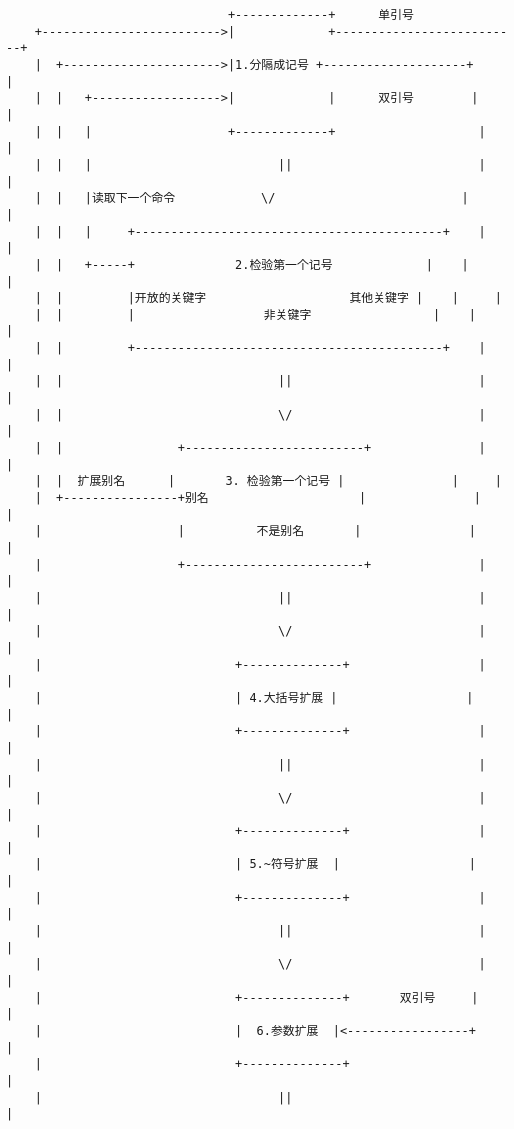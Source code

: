 \begin{lstlisting}
                               +-------------+      单引号
    +------------------------->|             +--------------------------+
    |  +---------------------->|1.分隔成记号 +--------------------+     |
    |  |   +------------------>|             |      双引号        |     |
    |  |   |                   +-------------+                    |     |
    |  |   |                          ||                          |     |
    |  |   |读取下一个命令            \/                          |     |
    |  |   |     +-------------------------------------------+    |     |
    |  |   +-----+              2.检验第一个记号             |    |     |
    |  |         |开放的关键字                    其他关键字 |    |     |
    |  |         |                  非关键字                 |    |     |
    |  |         +-------------------------------------------+    |     |
    |  |                              ||                          |     |
    |  |                              \/                          |     |
    |  |                +-------------------------+               |     |
    |  |  扩展别名      |       3. 检验第一个记号 |               |     |
    |  +----------------+别名                     |               |     |
    |                   |          不是别名       |               |     |
    |                   +-------------------------+               |     |
    |                                 ||                          |     |
    |                                 \/                          |     |
    |                           +--------------+                  |     |
    |                           | 4.大括号扩展 |                  |     |
    |                           +--------------+                  |     |
    |                                 ||                          |     |
    |                                 \/                          |     |
    |                           +--------------+                  |     |
    |                           | 5.~符号扩展  |                  |     |
    |                           +--------------+                  |     |
    |                                 ||                          |     |
    |                                 \/                          |     |
    |                           +--------------+       双引号     |     |
    |                           |  6.参数扩展  |<-----------------+     |
    |                           +--------------+                        |
    |                                 ||                                |

\end{lstlisting}
